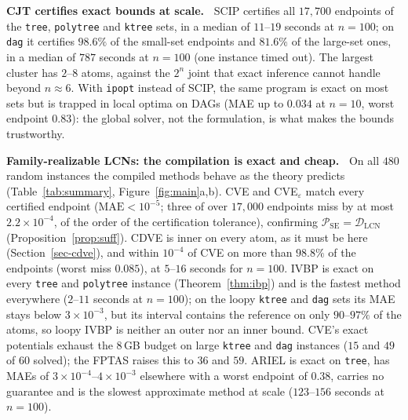 \documentclass{article} %
\newenvironment{revblock}{\color{blue}}{}
\newcommand{\DLCN}{\mathcal{D}_{\mathrm{LCN}}}
\begin{document}
\begin{revblock}
\textbf{CJT certifies exact bounds at scale.~}
SCIP certifies all $17{,}700$ endpoints of the \texttt{tree}, \texttt{polytree} and \texttt{ktree} sets, in a median of $11$--$19$ seconds at $n{=}100$; on \texttt{dag} it certifies $98.6\%$ of the small-set endpoints and $81.6\%$ of the large-set ones, in a median of $787$ seconds at $n{=}100$ (one instance timed out). The largest cluster has $2$--$8$ atoms, against the $2^n$ joint that exact inference cannot handle beyond $n\approx 6$. With \texttt{ipopt} instead of SCIP, the same program is exact on most sets but is trapped in local optima on DAGs (MAE up to $0.034$ at $n{=}10$, worst endpoint $0.83$): the global solver, not the formulation, is what makes the bounds trustworthy.

\textbf{Family-realizable LCNs: the compilation is exact and cheap.~}
On all $480$ random instances the compiled methods behave as the theory predicts (Table~\ref{tab:summary}, Figure~\ref{fig:main}a,b). CVE and CVE$_\varepsilon$ match every certified endpoint ($\mathrm{MAE}<10^{-5}$; three of over $17{,}000$ endpoints miss by at most $2.2\times10^{-4}$, of the order of the certification tolerance), confirming $\mathcal P_{\mathrm{SE}}=\DLCN$ (Proposition~\ref{prop:suff}). CDVE is inner on every atom, as it must be here (Section~\ref{sec-cdve}), and within $10^{-4}$ of CVE on more than $98.8\%$ of the endpoints (worst miss $0.085$), at $5$--$16$ seconds for $n{=}100$. IVBP is exact on every \texttt{tree} and \texttt{polytree} instance (Theorem~\ref{thm:ibp}) and is the fastest method everywhere ($2$--$11$ seconds at $n{=}100$); on the loopy \texttt{ktree} and \texttt{dag} sets its MAE stays below $3\times 10^{-3}$, but its interval contains the reference on only $90$--$97\%$ of the atoms, so loopy IVBP is neither an outer nor an inner bound. CVE's exact potentials exhaust the $8$\,GB budget on large \texttt{ktree} and \texttt{dag} instances ($15$ and $49$ of $60$ solved); the FPTAS raises this to $36$ and $59$. ARIEL is exact on \texttt{tree}, has MAEs of $3\times10^{-4}$--$4\times10^{-3}$ elsewhere with a worst endpoint of $0.38$, carries no guarantee and is the slowest approximate method at scale ($123$--$156$ seconds at $n{=}100$).


\end{revblock}
\end{document}

